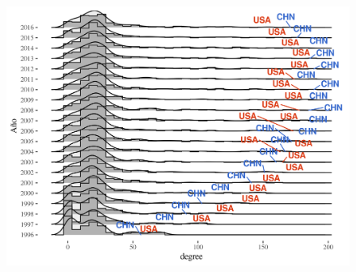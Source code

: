 \documentclass[compress]{beamer}
\begin{document}
\begin{frame}
\begin{columns}[c]
\begin{flushleft}
\begin{figure}
\includegraphics[scale=0.35]{impo_densidad_USAvsCHN_grado_x_yr}
\end{figure}
\end{flushleft}

\end{columns}
\end{frame}
\end{document}
